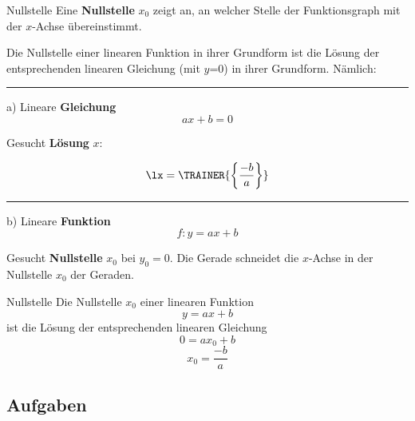 \begin{definition}{Nullstelle}{}
  Eine \textbf{Nullstelle} $x_0$ zeigt an, an welcher Stelle der
  Funktionsgraph mit der $x$-Achse übereinstimmt.
\end{definition}


Die Nullstelle einer linearen Funktion in ihrer Grundform ist die Lösung der entsprechenden linearen Gleichung (mit
$y$=0) in ihrer Grundform. Nämlich:

\hrule

a) Lineare \textbf{Gleichung} $$ax+b=0$$

Gesucht \textbf{Lösung} $x$:


\vspace{1mm}


$$\lx = \TRAINER{\left\{\frac{-b}{a}\right\}}  $$

\hrule

\newpage
b) Lineare \textbf{Funktion} $$f: y=ax+b$$

Gesucht \textbf{Nullstelle} $x_0$ bei $y_0=0$. Die Gerade schneidet
die $x$-Achse in der Nullstelle $x_0$ der Geraden.

\begin{gesetz}{Nullstelle}{}
  Die Nullstelle $x_0$ einer linearen Funktion $$y=ax+b$$ ist die Lösung der
  entsprechenden linearen Gleichung $$0=ax_0+b$$
  $$x_0 = \frac{-b}{a}$$
\end{gesetz}

\newpage

\subsection*{Aufgaben}



\newpage

